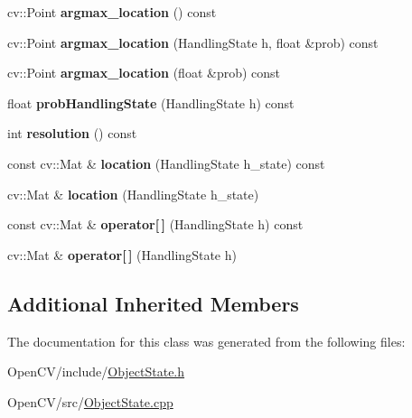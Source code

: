 \begin{DoxyCompactItemize}
cv\+::\+Point {\bfseries argmax\+\_\+location} () const
\item 
\hypertarget{classskl_1_1_object_state_a39fa0da0d058be0daf30b4cda4025dae}{}\label{classskl_1_1_object_state_a39fa0da0d058be0daf30b4cda4025dae} 
cv\+::\+Point {\bfseries argmax\+\_\+location} (Handling\+State h, float \&prob) const
\item 
\hypertarget{classskl_1_1_object_state_a8bc3f2ac6f88a460f244d6f64d437603}{}\label{classskl_1_1_object_state_a8bc3f2ac6f88a460f244d6f64d437603} 
cv\+::\+Point {\bfseries argmax\+\_\+location} (float \&prob) const
\item 
\hypertarget{classskl_1_1_object_state_a23a03a3bd6eeff791756cdc0cddc00ad}{}\label{classskl_1_1_object_state_a23a03a3bd6eeff791756cdc0cddc00ad} 
float {\bfseries prob\+Handling\+State} (Handling\+State h) const
\item 
\hypertarget{classskl_1_1_object_state_af9c33e4dc0a97aa12097585e581799ca}{}\label{classskl_1_1_object_state_af9c33e4dc0a97aa12097585e581799ca} 
int {\bfseries resolution} () const
\item 
\hypertarget{classskl_1_1_object_state_ac1f11d384a0abe08b432e52365cedb5d}{}\label{classskl_1_1_object_state_ac1f11d384a0abe08b432e52365cedb5d} 
const cv\+::\+Mat \& {\bfseries location} (Handling\+State h\+\_\+state) const
\item 
\hypertarget{classskl_1_1_object_state_a7d955879826351089d98bac30604c9dd}{}\label{classskl_1_1_object_state_a7d955879826351089d98bac30604c9dd} 
cv\+::\+Mat \& {\bfseries location} (Handling\+State h\+\_\+state)
\item 
\hypertarget{classskl_1_1_object_state_a96dddb1afb7508618cefc07cf1dd8894}{}\label{classskl_1_1_object_state_a96dddb1afb7508618cefc07cf1dd8894} 
const cv\+::\+Mat \& {\bfseries operator\mbox{[}$\,$\mbox{]}} (Handling\+State h) const
\item 
\hypertarget{classskl_1_1_object_state_a0c7b27f3a691a1002e8701adfff0bc8e}{}\label{classskl_1_1_object_state_a0c7b27f3a691a1002e8701adfff0bc8e} 
cv\+::\+Mat \& {\bfseries operator\mbox{[}$\,$\mbox{]}} (Handling\+State h)
\end{DoxyCompactItemize}
\subsection*{Additional Inherited Members}


The documentation for this class was generated from the following files\+:\begin{DoxyCompactItemize}
\item 
Open\+C\+V/include/\hyperlink{_object_state_8h}{Object\+State.\+h}\item 
Open\+C\+V/src/\hyperlink{_object_state_8cpp}{Object\+State.\+cpp}\end{DoxyCompactItemize}

